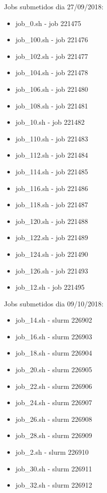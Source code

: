 \documentclass[12pt, a4paper]{report}
\begin{document}
Jobs submetidos dia 27/09/2018:
\begin{itemize}
\item job\_0.sh - job 221475
\item job\_100.sh - job 221476
\item job\_102.sh - job 221477
\item job\_104.sh - job 221478
\item job\_106.sh - job 221480
\item job\_108.sh - job 221481
\item job\_10.sh - job 221482
\item job\_110.sh - job 221483
\item job\_112.sh - job 221484
\item job\_114.sh - job 221485
\item job\_116.sh - job 221486
\item job\_118.sh - job 221487
\item job\_120.sh - job 221488
\item job\_122.sh - job 221489
\item job\_124.sh - job 221490
\item job\_126.sh - job 221493
\item job\_12.sh - job 221495
\end{itemize}

Jobs submetidos dia 09/10/2018:
\begin{itemize}
\item job\_14.sh - slurm 226902
\item job\_16.sh - slurm 226903
\item job\_18.sh - slurm 226904
\item job\_20.sh - slurm 226905
\item job\_22.sh - slurm 226906
\item job\_24.sh - slurm 226907
\item job\_26.sh - slurm 226908
\item job\_28.sh - slurm 226909
\item job\_2.sh - slurm 226910
\item job\_30.sh - slurm 226911
\item job\_32.sh - slurm 226912
\end{itemize}
\end{document}
